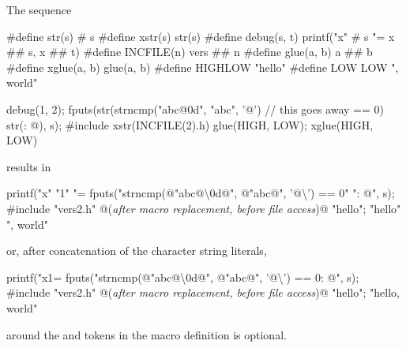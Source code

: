 \documentclass{wg21}
\newcommand{\cwhitespace}[1]{\removed{#1} \added{\grammarterm{whitespace}}}
\begin{document}
\pnum
\begin{example}
    The sequence
    \begin{codeblock}
        #define str(s)      # s
        #define xstr(s)     str(s)
        #define debug(s, t) printf("x" # s "= %
        x ## s, x ## t)
        #define INCFILE(n)  vers ## n
        #define glue(a, b)  a ## b
        #define xglue(a, b) glue(a, b)
        #define HIGHLOW     "hello"
        #define LOW         LOW ", world"

        debug(1, 2);
        fputs(str(strncmp("abc@\textbackslash@0d", "abc", '@')        // this goes away
        == 0) str(: @\atsign\textbackslash@n), s);
        #include xstr(INCFILE(2).h)
        glue(HIGH, LOW);
        xglue(HIGH, LOW)
    \end{codeblock}
    results in
    \begin{codeblock}
        printf("x" "1" "= %
        fputs("strncmp(@\textbackslash@"abc@\textbackslash\textbackslash@0d@\textbackslash@", @\textbackslash@"abc@\textbackslash@", '@\textbackslash{}') == 0" ": @\atsign\textbackslash@n", s);
        #include "vers2.h"      @\textrm{(\textit{after macro replacement, before file access})}@
        "hello";
        "hello" ", world"
    \end{codeblock}
    or, after concatenation of the character string literals,
    \begin{codeblock}
        printf("x1= %
        fputs("strncmp(@\textbackslash@"abc@\textbackslash\textbackslash@0d@\textbackslash@", @\textbackslash@"abc@\textbackslash@", '@\textbackslash{}') == 0: @\atsign\textbackslash@n", s);
        #include "vers2.h"      @\textrm{(\textit{after macro replacement, before file access})}@
        "hello";
        "hello, world"
    \end{codeblock}

     \cwhitespace{Space} around the \tcode{\#} and \tcode{\#\#} tokens in the macro definition
    is optional.
\end{example}
\end{document}
